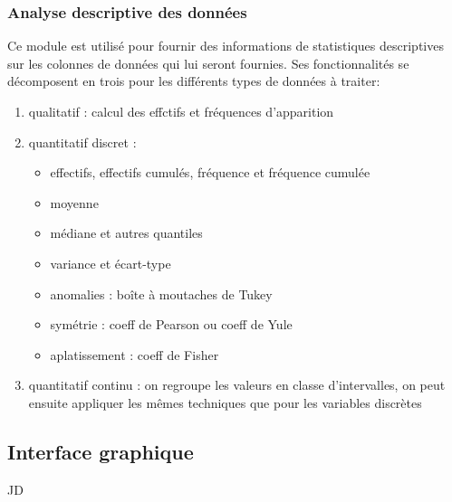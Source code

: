 			\subsubsection{Analyse descriptive des données}
				Ce module est utilisé pour fournir des informations de statistiques descriptives sur les colonnes de données qui lui seront fournies. Ses fonctionnalités se décomposent en trois pour les différents types de données à traiter:\\
				\begin{enumerate}
				\item qualitatif : calcul des effctifs et fréquences d'apparition
				\item quantitatif discret :\\
					\begin{itemize}
					\item effectifs, effectifs cumulés, fréquence et fréquence cumulée
					\item moyenne
					\item médiane et autres quantiles
					\item variance et écart-type
					\item anomalies : boîte à moutaches de Tukey
					\item symétrie : coeff de Pearson ou coeff de Yule
					\item aplatissement : coeff de Fisher
					\end{itemize}
				\item quantitatif continu : on regroupe les valeurs en classe d'intervalles, on peut ensuite appliquer les mêmes techniques que pour les variables discrètes
				\end{enumerate}
			
		\subsection{Interface graphique}
			JD
		
		
	

